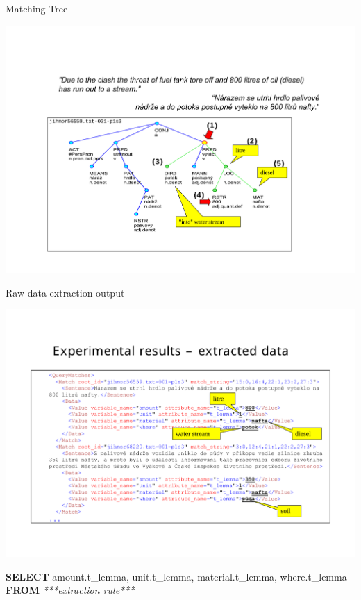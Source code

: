 \documentclass[xcolor=dvipsnames]{beamer}
\begin{document}
\begin{frame}{Matching Tree}
\centerline{\includegraphics[height=1.15\vsize, angle=-90]{img/eenv_tree}}
\end{frame}


\begin{frame}{Raw data extraction output}
\centerline{\includegraphics[height=1.25\vsize, angle=-90]{img/eenv_results}}
{\scriptsize
\medskip
\textbf{SELECT} \alert{amount}.t\_lemma, \alert{unit}.t\_lemma, 
\alert{material}.t\_lemma, \alert{where}.t\_lemma
\\ \textbf{FROM} \emph{***extraction rule***} 
}
\end{frame}
\end{document}
